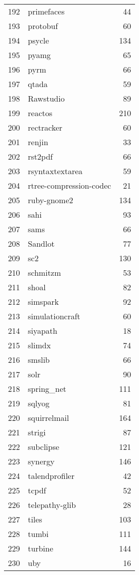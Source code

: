 \begin{table}[ht]
\begin{tabular}{rlr}
  192 & primefaces &  44 \\ 
  193 & protobuf &  60 \\ 
  194 & psycle & 134 \\ 
  195 & pyamg &  65 \\ 
  196 & pyrm &  66 \\ 
  197 & qtada &  59 \\ 
  198 & Rawstudio &  89 \\ 
  199 & reactos & 210 \\ 
  200 & rectracker &  60 \\ 
  201 & renjin &  33 \\ 
  202 & rst2pdf &  66 \\ 
  203 & rsyntaxtextarea &  59 \\ 
  204 & rtree-compression-codec &  21 \\ 
  205 & ruby-gnome2 & 134 \\ 
  206 & sahi &  93 \\ 
  207 & sams &  66 \\ 
  208 & Sandlot &  77 \\ 
  209 & sc2 & 130 \\ 
  210 & schmitzm &  53 \\ 
  211 & shoal &  82 \\ 
  212 & simspark &  92 \\ 
  213 & simulationcraft &  60 \\ 
  214 & siyapath &  18 \\ 
  215 & slimdx &  74 \\ 
  216 & smslib &  66 \\ 
  217 & solr &  90 \\ 
  218 & spring\_net & 111 \\ 
  219 & sqlyog &  81 \\ 
  220 & squirrelmail & 164 \\ 
  221 & strigi &  87 \\ 
  222 & subclipse & 121 \\ 
  223 & synergy & 146 \\ 
  224 & talendprofiler &  42 \\ 
  225 & tcpdf &  52 \\ 
  226 & telepathy-glib &  28 \\ 
  227 & tiles & 103 \\ 
  228 & tumbi & 111 \\ 
  229 & turbine & 144 \\ 
  230 & uby &  16 \\ 

\end{tabular}
\end{table}
